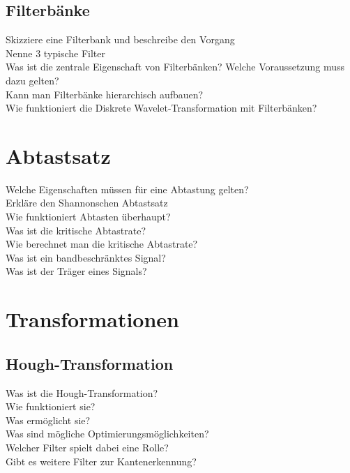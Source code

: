 \subsection{Filterbänke}
\begin{description}
	\item[Skizziere eine Filterbank und beschreibe den Vorgang]
	\item[Nenne 3 typische Filter]
	\item[Was ist die zentrale Eigenschaft von Filterbänken? Welche Voraussetzung muss dazu gelten?]
	\item[Kann man Filterbänke hierarchisch aufbauen?]
    \item [Wie funktioniert die Diskrete Wavelet-Transformation mit Filterbänken?] 
\end{description}
\section{Abtastsatz}
\begin{description}
	\item[Welche Eigenschaften müssen für eine Abtastung gelten?]
	\item[Erkläre den Shannonschen Abtastsatz]
	\item[Wie funktioniert Abtasten überhaupt?]
	\item[Was ist die kritische Abtastrate?]
	\item[Wie berechnet man die kritische Abtastrate?]
	\item[Was ist ein bandbeschränktes Signal?]
	\item[Was ist der Träger eines Signals?]
	\end{description}
\section{Transformationen}
\subsection{Hough-Transformation}
\begin{description}
	\item[Was ist die Hough-Transformation?]
	\item[Wie funktioniert sie?]
	\item[Was ermöglicht sie?]
    \item[Was sind mögliche Optimierungsmöglichkeiten?]
	\item[Welcher Filter spielt dabei eine Rolle?]
	\item[Gibt es weitere Filter zur Kantenerkennung?]
\end{description}

